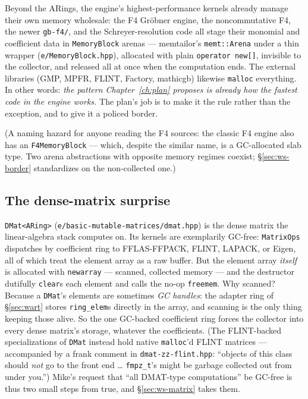 \documentclass[11pt,oneside]{report}
\newcommand{\code}[1]{\textcolor{m2code}{\texttt{#1}}}
\newcommand{\file}[1]{\textcolor{m2file}{\texttt{#1}}}
\begin{document}
Beyond the ARings, the engine's highest-performance kernels already manage
their own memory wholesale: the F4 Gr\"obner engine, the noncommutative
F4, the newer \file{gb-f4/}, and the Schreyer-resolution code all stage
their monomial and coefficient data in \code{MemoryBlock} arenas ---
memtailor's \code{memt::Arena} under a thin wrapper
(\file{e/MemoryBlock.hpp}), allocated with plain \code{operator new[]},
invisible to the collector, and released all at once when the computation
ends. The external libraries (GMP, MPFR, FLINT, Factory, mathicgb) likewise
\code{malloc} everything. In other words: \emph{the pattern
Chapter~\ref{ch:plan} proposes is already how the fastest code in the
engine works.} The plan's job is to make it the rule rather than the
exception, and to give it a policed border.

(A naming hazard for anyone reading the F4 sources: the classic F4 engine
also has an \code{F4MemoryBlock} --- which, despite the similar name, is a
GC-allocated slab type. Two arena abstractions with opposite memory regimes
coexist; \S\ref{sec:ws-border} standardizes on the non-collected one.)

\subsection{The dense-matrix surprise}
\label{sec:dmatsurprise}

\code{DMat<ARing>} (\file{e/basic-mutable-matrices/dmat.hpp}) is the dense
matrix the linear-algebra stack computes on. Its kernels are exemplarily
GC-free: \code{MatrixOps} dispatches by coefficient ring to FFLAS-FFPACK,
FLINT, LAPACK, or Eigen, all of which treat the element array as a raw
buffer. But the element array \emph{itself} is allocated with
\code{newarray} --- scanned, collected memory --- and the destructor
dutifully \code{clear}s each element and calls the no-op \code{freemem}.
Why scanned? Because a \code{DMat}'s elements are sometimes \emph{GC
handles}: the adapter ring of \S\ref{sec:wart} stores \code{ring\_elem}s
directly in the array, and scanning is the only thing keeping those alive.
So the one GC-backed coefficient ring forces the collector into every dense
matrix's storage, whatever the coefficients. (The FLINT-backed
specializations of \code{DMat} instead hold native \code{malloc}'d FLINT
matrices --- accompanied by a frank comment in
\file{dmat-zz-flint.hpp}: ``objects of this class should \emph{not} go to
the front end \ldots{} \code{fmpz\_t}'s might be garbage collected out from
under you.'') Mike's request that ``all DMAT-type computations'' be
GC-free is thus two small steps from true, and \S\ref{sec:ws-matrix} takes
them.
\end{document}

